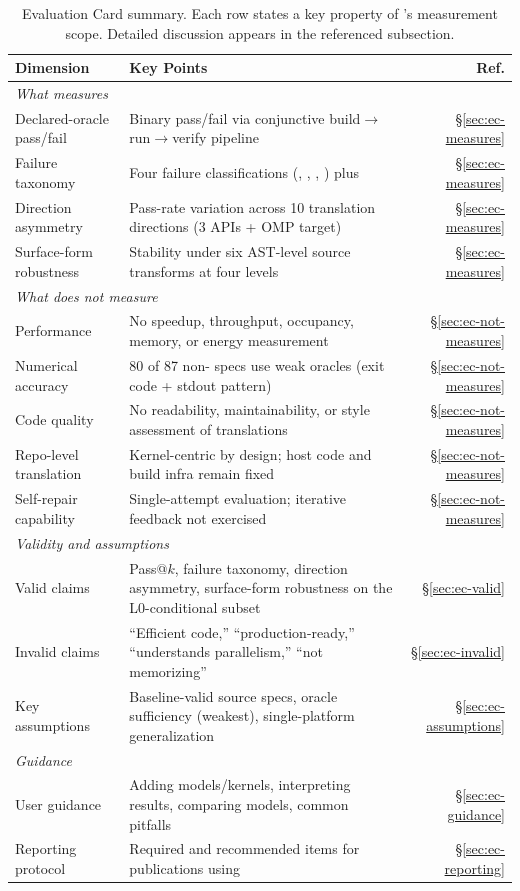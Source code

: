 \begin{table}[htbp]
\centering
\caption{Evaluation Card summary. Each row states a key property of \parbench{}'s
measurement scope. Detailed discussion appears in the referenced subsection.}
\label{tab:eval-card-summary}
\small
\begin{tabularx}{\textwidth}{@{}p{2.8cm}Xr@{}}
\toprule
Dimension & Key Points & Ref. \\
\midrule
\multicolumn{3}{l}{\textit{What \textnormal{\parbench{}} measures}} \\
Declared-oracle pass/fail & Binary pass/fail via conjunctive build$\to$run$\to$verify pipeline & \S\ref{sec:ec-measures} \\
Failure taxonomy & Four failure classifications (\extractionfail{}, \buildfail{}, \runfail{}, \verifyfail{}) plus \pass{} & \S\ref{sec:ec-measures} \\
Direction asymmetry & Pass-rate variation across 10 translation directions (3 APIs + OMP target) & \S\ref{sec:ec-measures} \\
Surface-form robustness & Stability under six AST-level source transforms at four levels & \S\ref{sec:ec-measures} \\
\midrule
\multicolumn{3}{l}{\textit{What \textnormal{\parbench{}} does not measure}} \\
Performance & No speedup, throughput, occupancy, memory, or energy measurement & \S\ref{sec:ec-not-measures} \\
Numerical accuracy & 80 of 87 non-\knownfail{} specs use weak oracles (exit code + stdout pattern) & \S\ref{sec:ec-not-measures} \\
Code quality & No readability, maintainability, or style assessment of translations & \S\ref{sec:ec-not-measures} \\
Repo-level translation & Kernel-centric by design; host code and build infra remain fixed & \S\ref{sec:ec-not-measures} \\
Self-repair capability & Single-attempt evaluation; iterative feedback not exercised & \S\ref{sec:ec-not-measures} \\
\midrule
\multicolumn{3}{l}{\textit{Validity and assumptions}} \\
Valid claims & Pass@$k$, failure taxonomy, direction asymmetry, surface-form robustness on the L0-conditional subset & \S\ref{sec:ec-valid} \\
Invalid claims & ``Efficient code,'' ``production-ready,'' ``understands parallelism,'' ``not memorizing'' & \S\ref{sec:ec-invalid} \\
Key assumptions & Baseline-valid source specs, oracle sufficiency (weakest), single-platform generalization & \S\ref{sec:ec-assumptions} \\
\midrule
\multicolumn{3}{l}{\textit{Guidance}} \\
User guidance & Adding models/kernels, interpreting results, comparing models, common pitfalls & \S\ref{sec:ec-guidance} \\
Reporting protocol & Required and recommended items for publications using \parbench{} & \S\ref{sec:ec-reporting} \\
\bottomrule
\end{tabularx}
\end{table}

